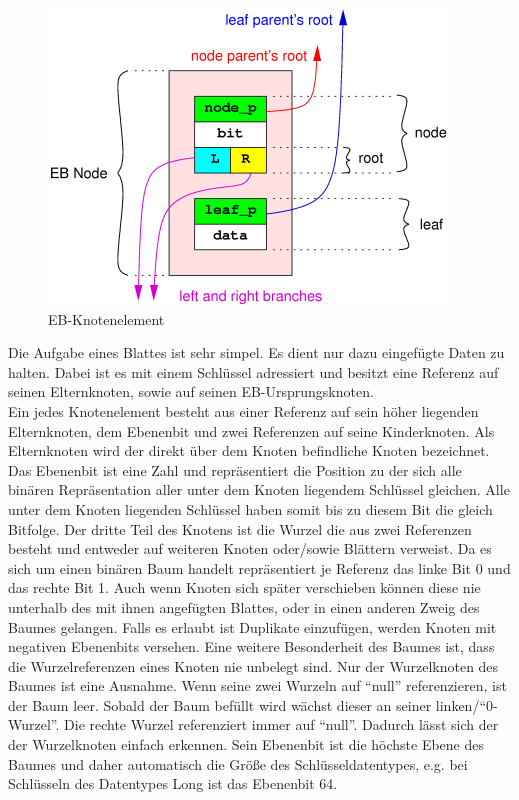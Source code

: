 \documentclass[a4paper,11pt,oneside,%
headsepline,												%
footsepline,												%
bibtotocnumbered									%
]{scrreprt}
\begin{document}
\begin{figure}
  \begin{center}
    \includegraphics[width=.8\linewidth]{bilder/Ebnode.png}
  \end{center}
 \caption{EB-Knotenelement \autocite{Tarreau}}
\end{figure}
Die Aufgabe eines Blattes ist sehr simpel. Es dient nur dazu eingefügte Daten zu halten. Dabei ist es mit einem Schlüssel adressiert und besitzt eine Referenz auf seinen Elternknoten, sowie auf seinen EB-Ursprungsknoten.\\

Ein jedes Knotenelement besteht aus einer Referenz auf sein höher liegenden Elternknoten, dem Ebenenbit  und zwei Referenzen auf seine Kinderknoten. 
Als Elternknoten wird der direkt über dem Knoten befindliche Knoten bezeichnet. Das Ebenenbit ist eine Zahl und repräsentiert die Position zu der sich alle binären Repräsentation aller unter dem Knoten liegendem Schlüssel gleichen.  Alle unter dem Knoten liegenden Schlüssel haben somit bis zu diesem Bit die gleich Bitfolge. Der dritte Teil des Knotens ist die Wurzel die aus zwei Referenzen besteht und entweder auf weiteren Knoten oder/sowie Blättern verweist. Da es sich um einen binären Baum handelt repräsentiert je Referenz das linke Bit 0 und das rechte Bit 1. Auch wenn Knoten sich später verschieben können diese nie unterhalb des mit ihnen angefügten Blattes, oder in einen anderen Zweig des Baumes gelangen. Falls es erlaubt ist Duplikate einzufügen, werden Knoten mit negativen Ebenenbits versehen. Eine weitere Besonderheit des Baumes ist, dass die Wurzelreferenzen eines Knoten nie unbelegt sind. Nur der Wurzelknoten des Baumes ist eine Ausnahme. Wenn seine zwei Wurzeln auf \enquote{null} referenzieren, ist der Baum leer. Sobald der Baum befüllt wird wächst dieser an seiner linken/\enquote{0-Wurzel}. Die rechte Wurzel referenziert immer auf \enquote{null}. Dadurch lässt sich der der Wurzelknoten einfach erkennen.
Sein Ebenenbit ist die höchste Ebene des Baumes und daher automatisch die Größe des Schlüsseldatentypes, e.g. bei Schlüsseln des Datentypes Long ist das Ebenenbit 64.\\
\end{document}
